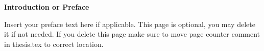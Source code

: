 

\begin{center}
\vspace*{5\baselineskip}
\textbf{\large Introduction or Preface}
\end{center}


\begin{flushleft}
\hspace{10mm}Insert your preface text here if applicable. This page is optional, you may delete it if not needed. If you delete this page make sure to move page counter comment in thesis.tex to correct location. 
\end{flushleft}




